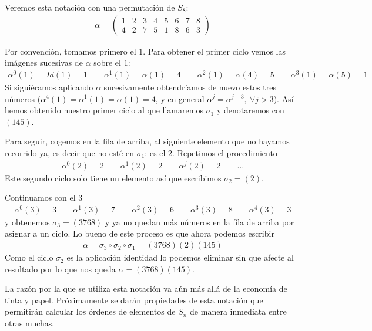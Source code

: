 Veremos esta notación con una permutación de $S_8$:
\begin{align*}
	\alpha = \left(\begin{array}{cccccccc}
	1 & 2 & 3 & 4 & 5 & 6 & 7 & 8 \\
	4 & 2 & 7 & 5 & 1 & 8 & 6 & 3
	\end{array}\right)
\end{align*}

Por convención, tomamos primero el $1$. Para obtener el primer ciclo vemos las imágenes sucesivas de $\alpha$ sobre el $1$:
\begin{align*}
	\alpha^0(1) = Id(1) = 1 \qquad \alpha^1(1) = \alpha(1) = 4 \qquad \alpha^2(1) = \alpha(4) = 5\qquad \alpha^3(1) = \alpha(5) = 1 
\end{align*}
Si siguiéramos aplicando $\alpha$ sucesivamente obtendríamos de nuevo estos tres números ($\alpha^4(1) = \alpha^1(1) = \alpha(1) = 4$, y en general $\alpha^j = \alpha^{j-3},\ \forall j > 3$). Así hemos obtenido nuestro primer ciclo al que llamaremos $\sigma_1$ y denotaremos con $(145)$.

Para seguir, cogemos en la fila de arriba, al siguiente elemento que no hayamos recorrido ya, es decir que no esté en $\sigma_1$: es el 2. Repetimos el procedimiento
\begin{align*}
	\alpha^0(2) = 2\qquad \alpha^1(2) = 2 \qquad \alpha^j(2) = 2 \qquad \dots
\end{align*}
Este segundo ciclo solo tiene un elemento así que escribimos $\sigma_2 = (2)$.

Continuamos con el 3
\begin{align*}
	\alpha^0(3) = 3 \qquad \alpha^1(3) = 7 \qquad \alpha^2(3) = 6 \qquad \alpha^3(3) = 8 \qquad \alpha^4(3) = 3
\end{align*}
y obtenemos $\sigma_3 = (3768)$ y ya no quedan más números en la fila de arriba por asignar a un ciclo. Lo bueno de este proceso es que ahora podemos escribir
\begin{align*}
	\alpha = \sigma_3 \circ \sigma_2 \circ  \sigma_1 = (3768)(2)(145)
\end{align*}
Como el ciclo $\sigma_2$ es la aplicación identidad lo podemos eliminar sin que afecte al resultado por lo que nos queda $\alpha = (3768)(145)$.

La razón por la que se utiliza esta notación va aún más allá de la economía de tinta y papel. Próximamente se darán propiedades de esta notación que permitirán calcular los órdenes de elementos de $S_n$ de manera inmediata entre otras muchas.


